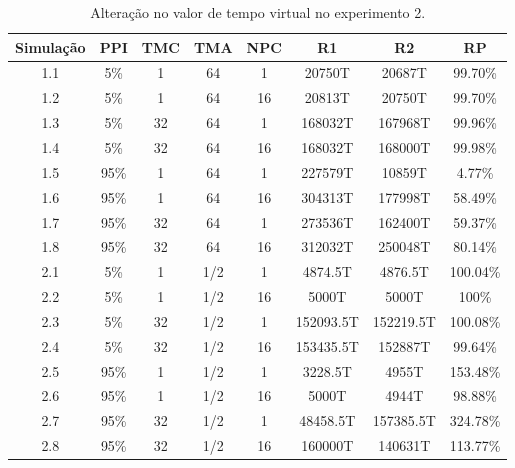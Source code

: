 \begin{table}
    \begin{center}
        \caption{Alteração no valor de tempo virtual no experimento 2.}
        \label{table:vtaltv1}
        \begin{tabular}{ |c|c|c|c|c|c|c|c| }
            \hline
            \textbf{Simulação} & \textbf{PPI} & \textbf{TMC} & \textbf{TMA} & \textbf{NPC} & \textbf{R1} & \textbf{R2} & \textbf{RP}\\
            \hline
            1.1 & 5\% & 1 & 64 & 1 & 20750T & 20687T & 99.70\%\\
            \hline
            1.2 & 5\% & 1 & 64 & 16 & 20813T & 20750T & 99.70\%\\
            \hline
            1.3 & 5\% & 32 & 64 & 1 & 168032T & 167968T & 99.96\%\\
            \hline
            1.4 & 5\% & 32 & 64 & 16 & 168032T & 168000T & 99.98\%\\
            \hline
            1.5 & 95\% & 1 & 64 & 1 & 227579T & 10859T & 4.77\%\\
            \hline
            1.6 & 95\% & 1 & 64 & 16 & 304313T & 177998T & 58.49\%\\
            \hline
            1.7 & 95\% & 32 & 64 & 1 & 273536T & 162400T & 59.37\%\\
            \hline
            1.8 & 95\% & 32 & 64 & 16 & 312032T & 250048T & 80.14\%\\
            \hline
             2.1 & 5\% & 1 & 1/2 & 1 & 4874.5T & 4876.5T & 100.04\%\\
            \hline
            2.2 & 5\% & 1 & 1/2 & 16 & 5000T & 5000T & 100\%\\
            \hline
            2.3 & 5\% & 32 & 1/2 & 1 & 152093.5T & 152219.5T & 100.08\%\\
            \hline
            2.4 & 5\% & 32 & 1/2 & 16 & 153435.5T & 152887T & 99.64\%\\
            \hline
            2.5 & 95\% & 1 & 1/2 & 1 & 3228.5T & 4955T & 153.48\%\\
            \hline
            2.6 & 95\% & 1 & 1/2 & 16 & 5000T & 4944T & 98.88\%\\
            \hline
            2.7 & 95\% & 32 & 1/2 & 1 & 48458.5T & 157385.5T & 324.78\%\\
            \hline
            2.8 & 95\% & 32 & 1/2 & 16 & 160000T & 140631T & 113.77\%\\
            \hline
            
        \end{tabular}{}
    \end{center}{}
\end{table}

